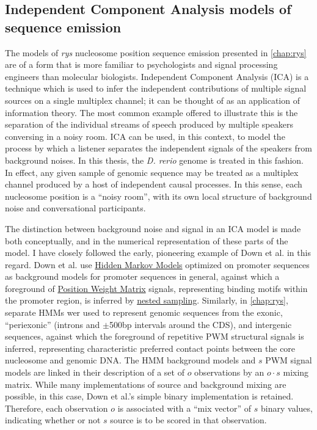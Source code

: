\subsection{Independent Component Analysis models of sequence emission}
The models of \textit{rys} nucleosome position sequence emission presented in \autoref{chap:rys} are of a form that is more familiar to psychologists and signal processing engineers than molecular biologists. Independent Component Analysis (ICA) is a technique which is used to infer the independent contributions of multiple signal sources on a single multiplex channel; it can be thought of as an application of information theory. The most common example offered to illustrate this is the separation of the individual streams of speech produced by multiple speakers conversing in a noisy room. ICA can be used, in this context, to model the process by which a listener separates the independent signals of the speakers from background noises. In this thesis, the \textit{D. rerio} genome is treated in this fashion. In effect, any given sample of genomic sequence may be treated as a multiplex channel produced by a host of independent causal processes. In this sense, each nucleosome position is a ``noisy room'', with its own local structure of background noise and conversational participants. 

The distinction between background noise and signal in an ICA model is made both conceptually, and in the numerical representation of these parts of the model. I have closely followed the early, pioneering example of Down et al. \cite{Down2005} in this regard. Down et al. use \hyperref[ssec:HMM]{Hidden Markov Models} optimized on promoter sequences as background models for promoter sequences in general, against which a foreground of \hyperref[ssec:PWM]{Position Weight Matrix} signals, representing binding motifs within the promoter region, is inferred by \hyperref[ssec:nested]{nested sampling}. Similarly, in \autoref{chap:rys}, separate HMMs wer used to represent genomic sequences from the exonic, ``periexonic'' (introns and $\pm$500bp intervals around the CDS), and intergenic sequences, against which the foreground of repetitive PWM structural signals is inferred, representing characteristic preferred contact points between the core nucleosome and genomic DNA. The HMM background models and $s$ PWM signal models are linked in their description of a set of $o$ observations by an $o \cdot s$ mixing matrix. While many implementations of source and background mixing are possible, in this case, Down et al.'s simple binary implementation is retained. Therefore, each observation $o$ is associated with a ``mix vector'' of $s$ binary values, indicating whether or not $s$ source is to be scored in that observation.

